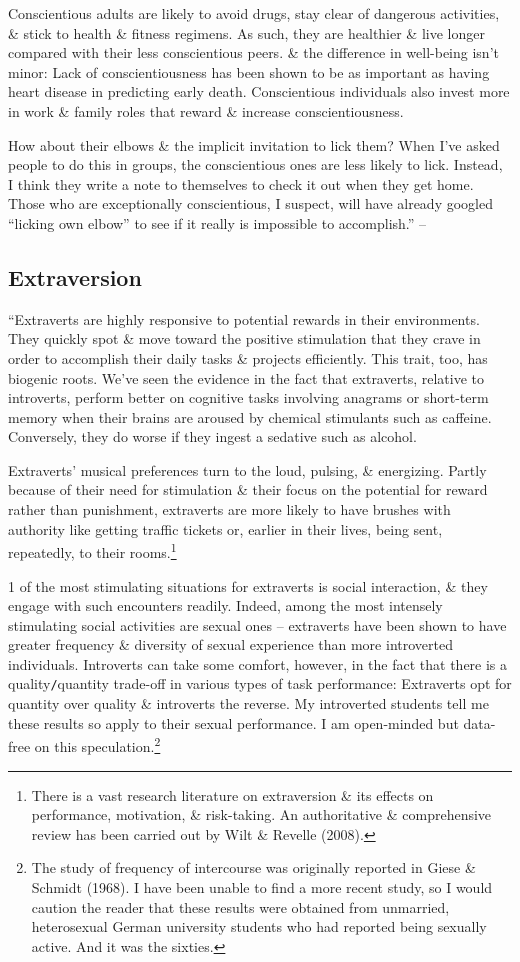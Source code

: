 \documentclass{article}
\numberwithin{equation}{section}
\begin{document}
Conscientious adults are likely to avoid drugs, stay clear of dangerous activities, \& stick to health \& fitness regimens. As such, they are healthier \& live longer compared with their less conscientious peers. \& the difference in well-being isn't minor: Lack of conscientiousness has been shown to be as important as having heart disease in predicting early death. Conscientious individuals also invest more in work \& family roles that reward \& increase conscientiousness.

How about their elbows \& the implicit invitation to lick them? When I've asked people to do this in groups, the conscientious ones are less likely to lick. Instead, I think they write a note to themselves to check it out when they get home. Those who are exceptionally conscientious, I suspect, will have already googled ``licking own elbow'' to see if it really is impossible to accomplish.'' -- \cite[pp. 17--18]{Little2017}

\subsection{Extraversion}
``Extraverts are highly responsive to potential rewards in their environments. They quickly spot \& move toward the positive stimulation that they crave in order to accomplish their daily tasks \& projects efficiently. This trait, too, has biogenic roots. We've seen the evidence in the fact that extraverts, relative to introverts, perform better on cognitive tasks involving anagrams or short-term memory when their brains are aroused by chemical stimulants such as caffeine. Conversely, they do worse if they ingest a sedative such as alcohol.

Extraverts' musical preferences turn to the loud, pulsing, \& energizing. Partly because of their need for stimulation \& their focus on the potential for reward rather than punishment, extraverts are more likely to have brushes with authority like getting traffic tickets or, earlier in their lives, being sent, repeatedly, to their rooms.\footnote{There is a vast research literature on extraversion \& its effects on performance, motivation, \& risk-taking. An authoritative \& comprehensive review has been carried out by Wilt \& Revelle (2008).}

1 of the most stimulating situations for extraverts is social interaction, \& they engage with such encounters readily. Indeed, among the most intensely stimulating social activities are sexual ones -- extraverts have been shown to have greater frequency \& diversity of sexual experience than more introverted individuals. Introverts can take some comfort, however, in the fact that there is a quality\texttt{/}quantity trade-off in various types of task performance: Extraverts opt for quantity over quality \& introverts the reverse. My introverted students tell me these results so apply to their sexual performance. I am open-minded but data-free on this speculation.\footnote{The study of frequency of intercourse was originally reported in Giese \& Schmidt (1968). I have been unable to find a more recent study, so I would caution the reader that these results were obtained from unmarried, heterosexual German university students who had reported being sexually active. And it was the sixties.}
\end{document}
